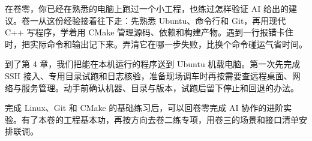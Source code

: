 在卷零，你已经在熟悉的电脑上跑过一个小工程，也练过怎样验证 AI 给出的建议。卷一从这份经验接着往下走：先熟悉 Ubuntu、命令行和 Git，再用现代 C++ 写程序，学着用 CMake 管理源码、依赖和构建产物。遇到一行报错卡住时，把实际命令和输出记下来。弄清它在哪一步失败，比换个命令碰运气省时间。

到了第 4 章，我们把能在本机运行的程序送到 Ubuntu 机载电脑。第一次先完成 SSH 接入、专用目录试跑和日志核验，准备现场调车时再按需要查远程桌面、网络与服务管理。动手前确认机器、目录与版本，试跑后留下停止和回退的办法。

完成 Linux、Git 和 CMake 的基础练习后，可以回卷零完成 AI 协作的进阶实验。有了本卷的工程基本功，再按方向去卷二练专项，用卷三的场景和接口清单安排联调。
